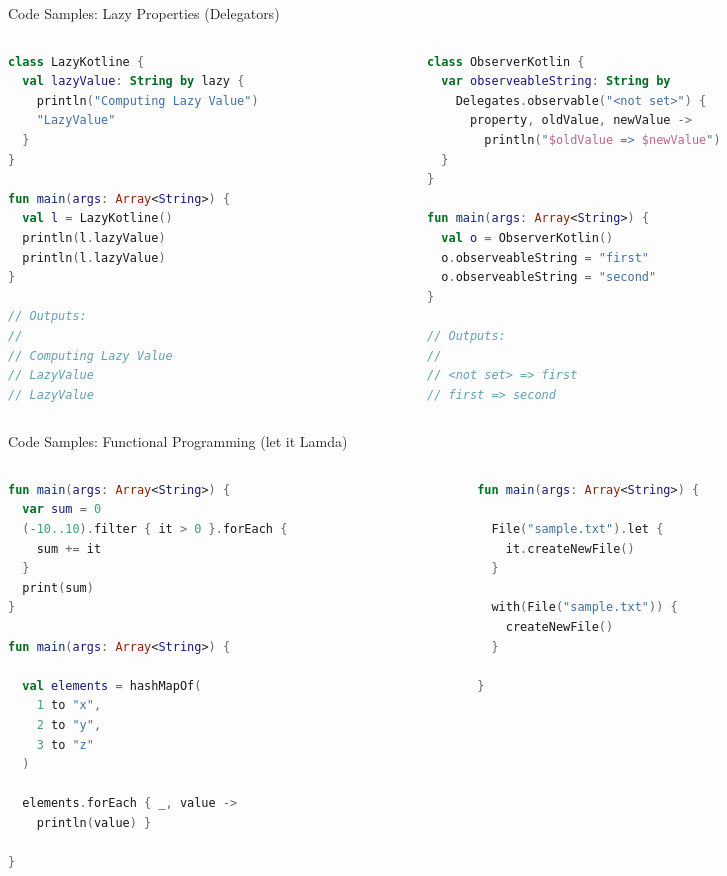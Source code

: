 \begin{frame}[fragile]{Code Samples: Lazy Properties (Delegators)}
	\begin{columns}
		\begin{column}{0.45\textwidth}
\begin{lstlisting}[language=Kotlin,basicstyle=\ttfamily\scriptsize]
class LazyKotline {
  val lazyValue: String by lazy {
    println("Computing Lazy Value")
    "LazyValue"
  }
}

fun main(args: Array<String>) {
  val l = LazyKotline()
  println(l.lazyValue)
  println(l.lazyValue)
}

// Outputs:
//
// Computing Lazy Value
// LazyValue
// LazyValue
\end{lstlisting}
		\end{column}
		\begin{column}{0.55\textwidth}
\begin{lstlisting}[language=Kotlin,basicstyle=\ttfamily\scriptsize]
class ObserverKotlin {
  var observeableString: String by
    Delegates.observable("<not set>") {
      property, oldValue, newValue ->
        println("$oldValue => $newValue")
  }
}

fun main(args: Array<String>) {
  val o = ObserverKotlin()
  o.observeableString = "first"
  o.observeableString = "second"
}

// Outputs:
//
// <not set> => first
// first => second
\end{lstlisting}
		\end{column}
	\end{columns}
\end{frame}

\begin{frame}[fragile]{Code Samples: Functional Programming (let it Lamda)}
	\begin{columns}
		\begin{column}{0.55\textwidth}
\begin{lstlisting}[language=Kotlin,basicstyle=\ttfamily\scriptsize]
fun main(args: Array<String>) {
  var sum = 0
  (-10..10).filter { it > 0 }.forEach {
    sum += it
  }
  print(sum)
}

fun main(args: Array<String>) {

  val elements = hashMapOf(
    1 to "x",
    2 to "y",
    3 to "z"
  )

  elements.forEach { _, value ->
    println(value) }

}
\end{lstlisting}
		\end{column}
		\begin{column}{0.45\textwidth}
\begin{lstlisting}[language=Kotlin,basicstyle=\ttfamily\scriptsize]
fun main(args: Array<String>) {

  File("sample.txt").let {
    it.createNewFile()
  }

  with(File("sample.txt")) {
    createNewFile()
  }

}
\end{lstlisting}
		\end{column}
	\end{columns}
\end{frame}

